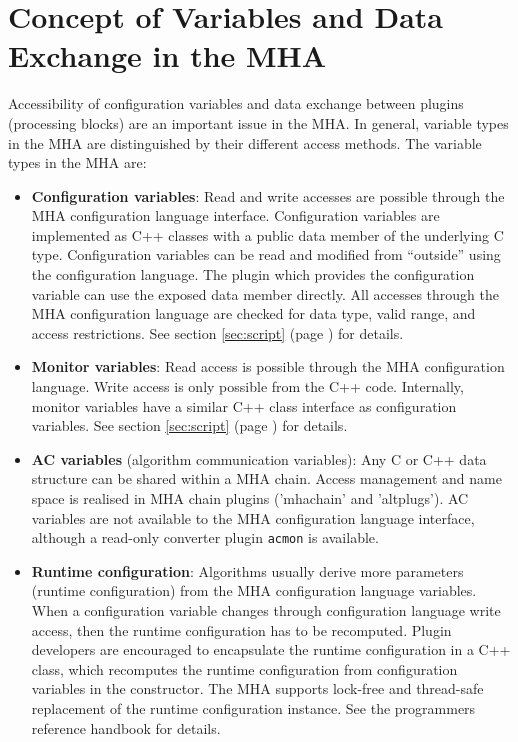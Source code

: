 \section{Concept of Variables and Data Exchange in the MHA}
\label{sec:variables}

Accessibility of configuration variables and
data exchange between plugins (processing blocks) are an important issue in the
MHA. In general, variable types in the MHA are distinguished by their
different access methods. The variable types in the MHA are:

\begin{itemize}
\item{\bf Configuration variables}: Read and
  write accesses are possible through the MHA configuration language interface.
  Configuration variables are implemented as C++ classes with a public data
  member of the underlying C type.
  Configuration variables can be read and modified from ``outside'' using the 
  configuration language.
  The plugin which provides the configuration variable can use 
  the exposed data member directly.
  All accesses through the MHA configuration language are checked for data
  type, valid range, and access restrictions. 
  See section \ref{sec:script} (page
  \pageref{sec:script}) for details.
  
\item{\bf Monitor variables}: Read access is possible
  through the MHA configuration language. 
  Write access is only possible from the C++ code. 
  Internally, monitor variables have a similar C++ class interface
  as configuration
  variables. See section \ref{sec:script} (page \pageref{sec:script}) for
  details.
  
\item{\bf AC variables} (algorithm
    communication variables): Any C or C++ data structure can be
    shared within a MHA chain. Access management and name space is
    realised in MHA chain plugins ('mhachain' and
    'altplugs'). 
    AC variables are not available to the MHA configuration language interface,
    although a read-only converter plugin \verb!acmon! is available.
  
\item{\bf Runtime configuration}: Algorithms
  usually derive more parameters (runtime configuration)
  from the MHA configuration language variables. 
  When a configuration variable changes through configuration language write 
  access, then the runtime configuration has to be recomputed.  
  Plugin developers are encouraged to encapsulate the runtime configuration in 
  a C++ class, which recomputes the runtime configuration from 
  configuration variables in the constructor.
  The MHA supports lock-free and thread-safe replacement of the 
  runtime configuration instance.
  See the programmers reference handbook for details.
\end{itemize}

